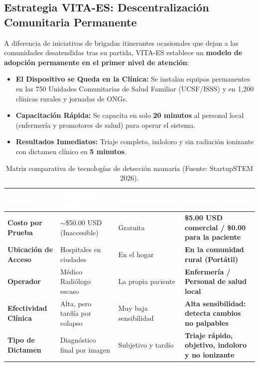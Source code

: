 \documentclass[11pt,a4paper]{article}
\begin{document}
\subsection{Estrategia VITA-ES: Descentralización Comunitaria Permanente}
A diferencia de iniciativas de brigadas itinerantes ocasionales que dejan a las comunidades desatendidas tras su partida, VITA-ES establece un \textbf{modelo de adopción permanente en el primer nivel de atención}:
\begin{itemize}
    \item \textbf{El Dispositivo se Queda en la Clínica:} Se instalan equipos permanentes en las 750 Unidades Comunitarias de Salud Familiar (UCSF/ISSS) y en 1,200 clínicas rurales y jornadas de ONGs.
    \item \textbf{Capacitación Rápida:} Se capacita en solo \textbf{20 minutos} al personal local (enfermería y promotores de salud) para operar el sistema.
    \item \textbf{Resultados Inmediatos:} Triaje completo, indoloro y sin radiación ionizante con dictamen clínico en \textbf{5 minutos}.
\end{itemize}

\begin{table}[H]
\centering
\small
\caption{Matriz comparativa de tecnologías de detección mamaria (Fuente: StartupSTEM 2026).}
\label{tab:comparativa}
\renewcommand{\arraystretch}{1.25}
\begin{tabularx}{\textwidth}{p{2.8cm} p{3.2cm} p{3.0cm} p{5.0cm}}
\rowcolor{tableheader}
\textcolor{white}{\textbf{Criterio}} & \textcolor{white}{\textbf{Mamografía Digital}} & \textcolor{white}{\textbf{Autoexploración}} & \textcolor{white}{\textbf{Solución VITA-ES}} \\
\toprule
\textbf{Costo por Prueba} & $\sim$\$50.00 USD (Inaccesible) & Gratuita & \textbf{\$5.00 USD comercial / \$0.00 para la paciente} \\
\rowcolor{tablezebra}
\textbf{Ubicación de Acceso} & Hospitales en ciudades & En el hogar & \textbf{En la comunidad rural (Portátil)} \\
\textbf{Operador} & Médico Radiólogo escaso & La propia paciente & \textbf{Enfermería / Personal de salud local} \\
\rowcolor{tablezebra}
\textbf{Efectividad Clínica} & Alta, pero tardía por colapso & Muy baja sensibilidad & \textbf{Alta sensibilidad: detecta cambios no palpables} \\
\textbf{Tipo de Dictamen} & Diagnóstico final por imagen & Subjetivo y tardío & \textbf{Triaje rápido, objetivo, indoloro y no ionizante} \\
\bottomrule
\end{tabularx}
\end{table}
\end{document}
